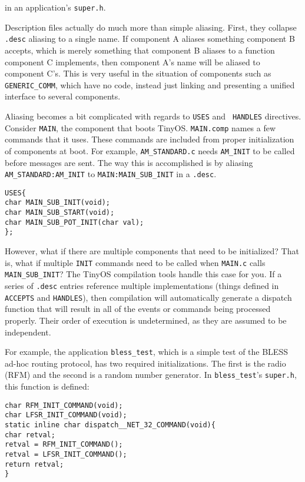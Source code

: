 \documentclass[12pt]{article}
\begin{document}
in an application's {\tt super.h}.

Description files actually do much more than simple aliasing. First,
they collapse {\tt .desc} aliasing to a single name. If component A
aliases something component B accepts, which is merely something that
component B aliases to a function component C implements, then
component A's name will be aliased to component C's. This is very
useful in the situation of components such as {\tt GENERIC\_COMM},
which have no code, instead just linking and presenting a unified
interface to several components.

Aliasing becomes a bit complicated with regards to {\tt USES} and {\tt
HANDLES} directives. Consider {\tt MAIN}, the component that boots
TinyOS. {\tt MAIN.comp} names a few commands that it uses. These
commands are included from proper initialization of components at
boot. For example, {\tt AM\_STANDARD.c} needs {\tt AM\_INIT} to be called before
messages are sent. The way this is accomplished is by aliasing {\tt
AM\_STANDARD:AM\_INIT} to {\tt MAIN:MAIN\_SUB\_INIT} in a {\tt .desc}.

\begin{verbatim}
USES{
char MAIN_SUB_INIT(void);
char MAIN_SUB_START(void);
char MAIN_SUB_POT_INIT(char val);
};
\end{verbatim}

However, what if there are multiple components that need to be
initialized? That is, what if multiple {\tt INIT} commands need to be
called when {\tt MAIN.c} calls {\tt MAIN\_SUB\_INIT}? The TinyOS
compilation tools handle this case for you. If a series of {\tt .desc}
entries reference multiple implementations (things defined in {\tt
ACCEPTS} and {\tt HANDLES}), then compilation will automatically
generate a dispatch function that will result in all of the events or
commands being processed properly. Their order of execution is
undetermined, as they are assumed to be independent.

For example, the application {\tt bless\_test}, which is a simple test
of the BLESS ad-hoc routing protocol, has two required
initializations. The first is the radio (RFM) and the second is a
random number generator. In {\tt bless\_test}'s {\tt super.h}, this
function is defined:

\begin{verbatim}
char RFM_INIT_COMMAND(void);
char LFSR_INIT_COMMAND(void);
static inline char dispatch__NET_32_COMMAND(void){
char retval;
retval = RFM_INIT_COMMAND();
retval = LFSR_INIT_COMMAND();
return retval;
}
\end{verbatim}
\end{document}
